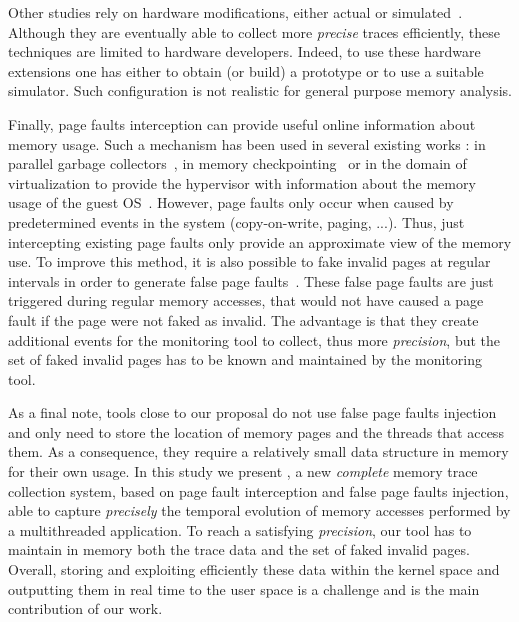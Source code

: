 Other studies rely on hardware modifications, either actual or
simulated~\cite{Bao08HMTT,Martonosi92MemSpy}.  Although they are eventually
able to collect more \emph{precise} traces efficiently, these techniques are limited
to hardware developers. Indeed, to use these hardware extensions one has
either to obtain (or build) a prototype or to use a suitable simulator. Such
configuration is not realistic for general purpose memory analysis.

Finally, page faults interception can provide useful online information about
memory usage. Such a mechanism has been used in several existing works : in
parallel garbage collectors~\cite{Boehm91Mostly}, in memory
checkpointing~\cite{Heo05Spaceefficient} or in the domain of virtualization to
provide the hypervisor with information about the memory usage of the guest
OS~\cite{Jones06Geiger}. However, page faults only occur when caused by
predetermined events in the system (copy-on-write, paging, ...). Thus, just intercepting existing page
faults only provide an approximate view of the memory use. To improve this method,
it is also possible to fake invalid
pages at regular intervals in order to generate false
page faults~\cite{Bae12Dynamic,Diener13CommunicationBased}.  These false page
faults are just triggered during regular memory accesses, that would not have
caused a page fault if the page were not faked as invalid. The advantage is
that they create additional events for the monitoring tool to collect, thus
more \emph{precision}, but the set of faked invalid pages has to be known and
maintained by the monitoring tool.

As a final note, tools close to our proposal do not use false page faults injection and only need to store the location of memory pages and the threads that access them.
As a consequence, they require a relatively small data structure in memory for their own usage.
In this study we present \Moca, a new \emph{complete} memory trace collection system, based on page
fault interception and false page faults injection, able to capture \emph{precisely} the temporal evolution of memory accesses performed by a multithreaded
application.
To reach a satisfying \emph{precision}, our tool has to maintain in memory both the trace data and
the set of faked invalid pages. Overall, storing and exploiting efficiently these data within the kernel space and outputting them in real time to the user space
is a challenge and is the main contribution of our work.
